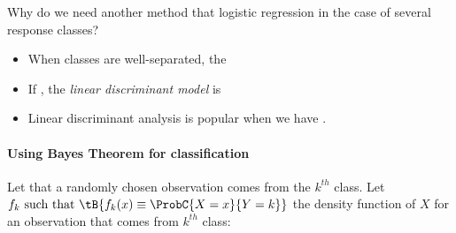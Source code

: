 Why do we need another method that logistic regression in the case of
several response classes?
\begin{itemize}
	\item When classes are well-separated, the 
	\item If , the
		\emph{linear discriminant model} is 
	\item Linear discriminant analysis is popular when we have 
		.
 \end{itemize}
\paragraph{Using Bayes Theorem for classification}
Let  that a randomly
chosen observation comes from the $k^{th}$ class. Let $f_{k}\text{ such
that }\tB{f_{k}(x) \equiv\ProbC{X=x}{Y=k}}$ the density function of $X$
for an observation that comes from $k^{th}$ class:\\
